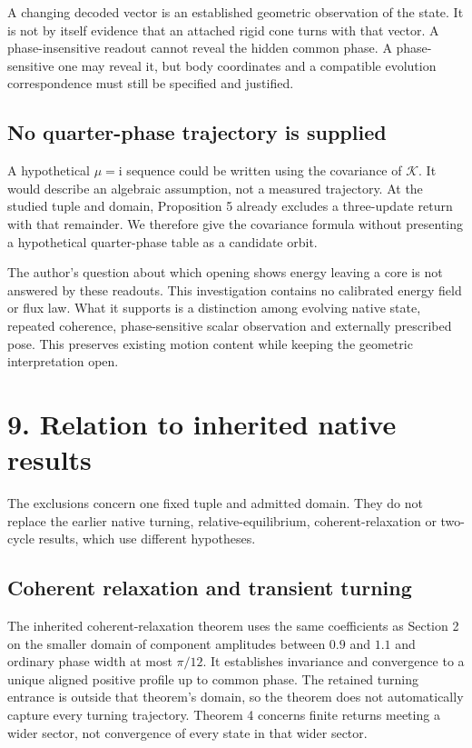 \documentclass[11pt,a4paper]{article}
\begin{document}
A changing decoded vector is an established geometric observation of the state. It is not by itself evidence that an attached rigid cone turns with that vector. A phase-insensitive readout cannot reveal the hidden common phase. A phase-sensitive one may reveal it, but body coordinates and a compatible evolution correspondence must still be specified and justified.

\subsection*{No quarter-phase trajectory is supplied}
A hypothetical $\mu=\mathrm{i}$ sequence could be written using the covariance of $\mathcal{K}$. It would describe an algebraic assumption, not a measured trajectory. At the studied tuple and domain, Proposition 5 already excludes a three-update return with that remainder. We therefore give the covariance formula without presenting a hypothetical quarter-phase table as a candidate orbit.

The author’s question about which opening shows energy leaving a core is not answered by these readouts. This investigation contains no calibrated energy field or flux law. What it supports is a distinction among evolving native state, repeated coherence, phase-sensitive scalar observation and externally prescribed pose. This preserves existing motion content while keeping the geometric interpretation open.

\clearpage
\section*{9. Relation to inherited native results}
The exclusions concern one fixed tuple and admitted domain. They do not replace the earlier native turning, relative-equilibrium, coherent-relaxation or two-cycle results, which use different hypotheses.

\subsection*{Coherent relaxation and transient turning}
The inherited coherent-relaxation theorem uses the same coefficients as Section 2 on the smaller domain of component amplitudes between $0.9$ and $1.1$ and ordinary phase width at most $\pi/12$. It establishes invariance and convergence to a unique aligned positive profile up to common phase. The retained turning entrance is outside that theorem’s domain, so the theorem does not automatically capture every turning trajectory. Theorem 4 concerns finite returns meeting a wider sector, not convergence of every state in that wider sector. \cite{COH}
\end{document}
